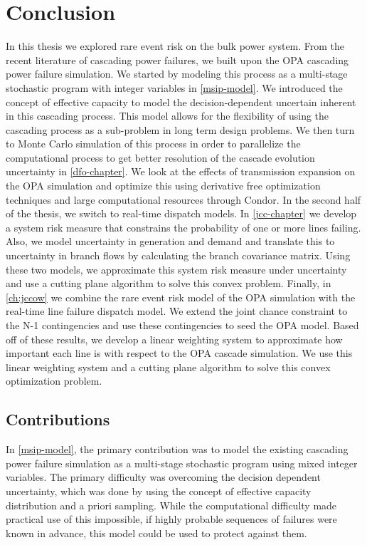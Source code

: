
\chapter{Conclusion}
In this thesis we explored rare event risk on the bulk power system.  From the recent literature of cascading power failures, we built upon the OPA cascading power failure simulation.  We started by modeling this process as a multi-stage stochastic program with integer variables in \cref{msip-model}.  We introduced the concept of effective capacity to model the decision-dependent uncertain inherent in this cascading process.  This model allows for the flexibility of using the cascading process as a sub-problem in long term design problems.  We then turn to Monte Carlo simulation of this process in order to parallelize the computational process to get better resolution of the cascade evolution uncertainty in \cref{dfo-chapter}.  We look at the effects of transmission expansion on the OPA simulation and optimize this using derivative free optimization techniques and large computational resources through Condor.  In the second half of the thesis, we switch to real-time dispatch models.  In \cref{jcc-chapter} we develop a system risk measure that constrains the probability of one or more lines failing.  Also, we model uncertainty in generation and demand and translate this to uncertainty in branch flows by calculating the branch covariance matrix.  Using these two models, we approximate this system risk measure under uncertainty and use a cutting plane algorithm to solve this convex problem.  Finally, in \cref{ch:jccow} we combine the rare event risk model of the OPA simulation with the real-time line failure dispatch model.  We extend the joint chance constraint to the N-1 contingencies and use these contingencies to seed the OPA model.  Based off of these results, we develop a linear weighting system to approximate how important each line is with respect to the OPA cascade simulation.  We use this linear weighting system and a cutting plane algorithm to solve this convex optimization problem.
\section{Contributions}
In \cref{msip-model}, the primary contribution was to model the existing cascading power failure simulation as a multi-stage stochastic program using mixed integer variables.  The primary difficulty was overcoming the decision dependent uncertainty, which was done by using the concept of effective capacity distribution and a priori sampling.  While the computational difficulty made practical use of this impossible, if highly probable sequences of failures were known in advance, this model could be used to protect against them.

